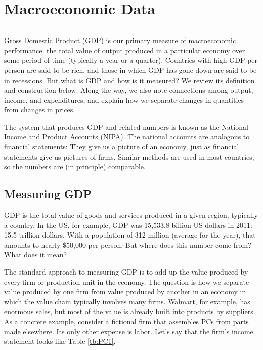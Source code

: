\chapter{Macroeconomic Data} \label{chp:macd}
\hypertarget{data}{}


\rule{\textwidth}{1pt}

Gross Domestic Product (GDP) is our primary measure of macroeconomic performance:
the total value of output produced in
a particular economy over some period of time (typically a year or
a quarter). Countries with high GDP per person are said to be
rich, and those in which GDP has gone down are said to be in
recessions. But what is GDP and how is it measured?
We review its definition and construction below.
Along the way, we also
note connections among output, income, and expenditures,
and explain how we separate changes in quantities
from changes in prices.

The system that produces GDP and related numbers
is known as the National Income and Product Accounts
(NIPA).
The national accounts are analogous to financial statements:
They give us a picture of an economy,
just as financial statements give us pictures of firms.
Similar methods are used in most countries, so the numbers
are (in principle) comparable.


\section{Measuring GDP}

GDP is the total value of goods and services produced in a given region,
typically a country.
In the US, for example, GDP was 15,533.8 billion US dollars in 2011:
15.5 trillion dollars. With a population of 312 million (average for the year),
that amounts to nearly \$50,000 per person.
But where does this number come from?  What does it mean?

The standard approach to measuring GDP is to add up the value
produced by every firm or production unit in the economy. The
question is how we separate value produced by one firm from value
produced by another in an economy in which the value chain
typically involves many firms. Walmart, for example, has enormous
sales, but most of the value is already
built into products by suppliers. As a concrete example, consider
a fictional firm that assembles PCs from parts made elsewhere. Its
only other expense is labor. Let's say that the firm's income
statement looks like Table \ref{tb:PC1}.

